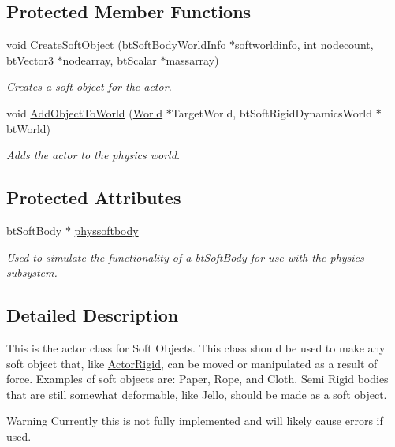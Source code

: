 \subsection*{Protected Member Functions}
\begin{DoxyCompactItemize}
\item 
void \hyperlink{classphys_1_1ActorSoft_a04c98bb0ab9ed7c1dfc3435d49403ef4}{CreateSoftObject} (btSoftBodyWorldInfo $\ast$softworldinfo, int nodecount, btVector3 $\ast$nodearray, btScalar $\ast$massarray)
\begin{DoxyCompactList}\small\item\em Creates a soft object for the actor. \item\end{DoxyCompactList}\item 
void \hyperlink{classphys_1_1ActorSoft_a3a704ab32f847a5d0e060f8a592efefd}{AddObjectToWorld} (\hyperlink{classphys_1_1World}{World} $\ast$TargetWorld, btSoftRigidDynamicsWorld $\ast$btWorld)
\begin{DoxyCompactList}\small\item\em Adds the actor to the physics world. \item\end{DoxyCompactList}\end{DoxyCompactItemize}
\subsection*{Protected Attributes}
\begin{DoxyCompactItemize}
\item 
\hypertarget{classphys_1_1ActorSoft_ab3b2c8e1f94dff3e3244a5024595afef}{
btSoftBody $\ast$ \hyperlink{classphys_1_1ActorSoft_ab3b2c8e1f94dff3e3244a5024595afef}{physsoftbody}}
\label{d4/d23/classphys_1_1ActorSoft_ab3b2c8e1f94dff3e3244a5024595afef}

\begin{DoxyCompactList}\small\item\em Used to simulate the functionality of a btSoftBody for use with the physics subsystem. \item\end{DoxyCompactList}\end{DoxyCompactItemize}


\subsection{Detailed Description}
This is the actor class for Soft Objects. This class should be used to make any soft object that, like \hyperlink{classphys_1_1ActorRigid}{ActorRigid}, can be moved or manipulated as a result of force. Examples of soft objects are: Paper, Rope, and Cloth. Semi Rigid bodies that are still somewhat deformable, like Jello, should be made as a soft object. \begin{DoxyWarning}{Warning}
Currently this is not fully implemented and will likely cause errors if used. 
\end{DoxyWarning}


